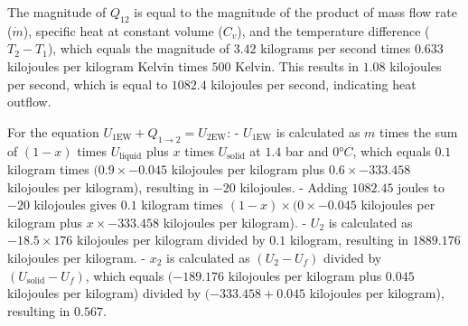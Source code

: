 The magnitude of \( Q_{12} \) is equal to the magnitude of the product of mass flow rate (\( \dot{m} \)), specific heat at constant volume (\( C_v \)), and the temperature difference (\( T_2 - T_1 \)), which equals the magnitude of \( 3.42 \) kilograms per second times \( 0.633 \) kilojoules per kilogram Kelvin times \( 500 \) Kelvin. This results in \( 1.08 \) kilojoules per second, which is equal to \( 1082.4 \) kilojoules per second, indicating heat outflow.

For the equation \( U_{1\text{EW}} + Q_{1\rightarrow 2} = U_{2\text{EW}} \):
- \( U_{1\text{EW}} \) is calculated as \( m \) times the sum of \( (1-x) \) times \( U_{\text{liquid}} \) plus \( x \) times \( U_{\text{solid}} \) at \( 1.4 \) bar and \( 0°C \), which equals \( 0.1 \) kilogram times \( (0.9 \times -0.045 \) kilojoules per kilogram plus \( 0.6 \times -333.458 \) kilojoules per kilogram), resulting in \( -20 \) kilojoules.
- Adding \( 1082.45 \) joules to \( -20 \) kilojoules gives \( 0.1 \) kilogram times \( (1-x) \times (0 \times -0.045 \) kilojoules per kilogram plus \( x \times -333.458 \) kilojoules per kilogram).
- \( U_2 \) is calculated as \( -18.5 \times 176 \) kilojoules per kilogram divided by \( 0.1 \) kilogram, resulting in \( 1889.176 \) kilojoules per kilogram.
- \( x_2 \) is calculated as \( (U_2 - U_f) \) divided by \( (U_{\text{solid}} - U_f) \), which equals \( (-189.176 \) kilojoules per kilogram plus \( 0.045 \) kilojoules per kilogram) divided by \( (-333.458 + 0.045 \) kilojoules per kilogram), resulting in \( 0.567 \).